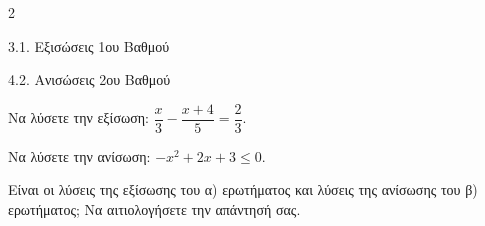 \begin{ylh}{2}
    \item 3.1. Εξισώσεις 1ου Βαθμού
    \item 4.2. Ανισώσεις 2ου Βαθμού
\end{ylh}

\begin{alist}
\item Να λύσετε την εξίσωση: $\dfrac{x}{3} - \dfrac{x + 4}{5} = \dfrac{2}{3}$.
\item Nα λύσετε την ανίσωση: $-x^2 + 2x + 3 \le 0$.
\item Είναι οι λύσεις της εξίσωσης του α) ερωτήματος και λύσεις της ανίσωσης του β) ερωτήματος; Να αιτιολογήσετε την απάντησή σας.
\end{alist}

